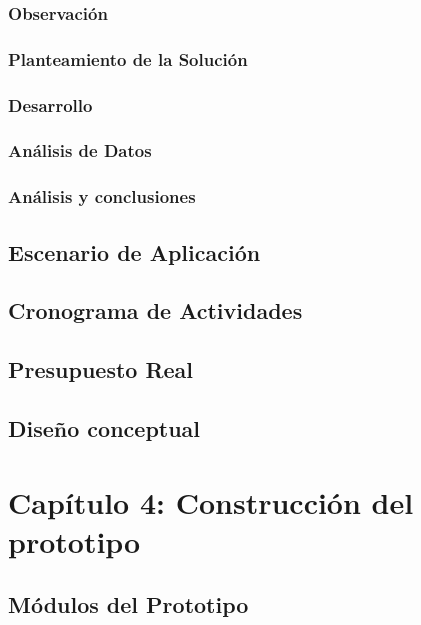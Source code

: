 \documentclass{extbook}
\begin{document}
\subsection{Observación}

\subsection{Planteamiento de la Solución}

\subsection{Desarrollo}

\subsection{Análisis de Datos}

\subsection{Análisis y conclusiones}

\section{Escenario de Aplicación}

\section{Cronograma de Actividades}

\section{Presupuesto Real}

\section{Diseño conceptual}



\chapter{Capítulo 4: Construcción del prototipo}
\section{Módulos del Prototipo}
\end{document}

